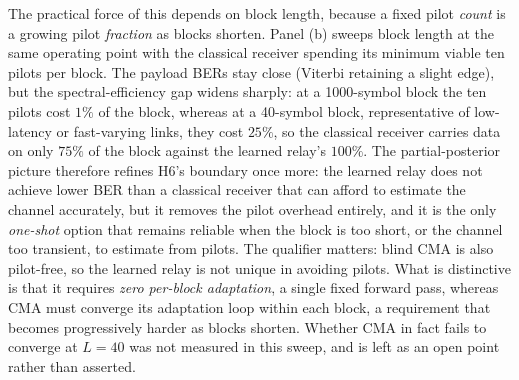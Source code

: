 The practical force of this depends on block length, because a fixed pilot \emph{count} is a growing pilot \emph{fraction} as blocks shorten. Panel (b) sweeps block length at the same operating point with the classical receiver spending its minimum viable ten pilots per block. The payload BERs stay close (Viterbi retaining a slight edge), but the spectral-efficiency gap widens sharply: at a 1000-symbol block the ten pilots cost $1\%$ of the block, whereas at a 40-symbol block, representative of low-latency or fast-varying links, they cost $25\%$, so the classical receiver carries data on only $75\%$ of the block against the learned relay's $100\%$. The partial-posterior picture therefore refines H6's boundary once more: the learned relay does not achieve lower BER than a classical receiver that can afford to estimate the channel accurately, but it removes the pilot overhead entirely, and it is the only \emph{one-shot} option that remains reliable when the block is too short, or the channel too transient, to estimate from pilots. The qualifier matters: blind CMA is also pilot-free, so the learned relay is not unique in avoiding pilots. What is distinctive is that it requires \emph{zero per-block adaptation}, a single fixed forward pass, whereas CMA must converge its adaptation loop within each block, a requirement that becomes progressively harder as blocks shorten. Whether CMA in fact fails to converge at $L = 40$ was not measured in this sweep, and is left as an open point rather than asserted.


